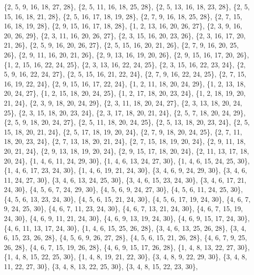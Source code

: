 \documentclass[11pt,a4paper]{article}
\begin{document}
{\{2, 5, 9, 16, 18, 27, 28\}, \{2, 5, 11, 16, 18, 25, 28\}, \{2, 5, 13, 16, 18, 23, 28\}, \{2, 5, 15, 16, 18, 21, 28\}, \{2, 5, 16, 17, 18, 19, 28\},
\{2, 7, 9, 16, 18, 25, 28\}, \{2, 7, 15, 16, 18, 19, 28\}, \{2, 9, 15, 16, 17, 18, 28\}, \{1, 2, 13, 16, 20, 26, 27\}, \{2, 3, 9, 16, 20, 26, 29\},
\{2, 3, 11, 16, 20, 26, 27\}, \{2, 3, 15, 16, 20, 23, 26\}, \{2, 3, 16, 17, 20, 21, 26\}, \{2, 5, 9, 16, 20, 26, 27\}, \{2, 5, 15, 16, 20, 21, 26\},
\{2, 7, 9, 16, 20, 25, 26\}, \{2, 9, 11, 16, 20, 21, 26\}, \{2, 9, 13, 16, 19, 20, 26\}, \{2, 9, 15, 16, 17, 20, 26\}, \{1, 2, 15, 16, 22, 24, 25\},
\{2, 3, 13, 16, 22, 24, 25\}, \{2, 3, 15, 16, 22, 23, 24\}, \{2, 5, 9, 16, 22, 24, 27\}, \{2, 5, 15, 16, 21, 22, 24\}, \{2, 7, 9, 16, 22, 24, 25\},
\{2, 7, 15, 16, 19, 22, 24\}, \{2, 9, 15, 16, 17, 22, 24\}, \{1, 2, 11, 18, 20, 24, 29\}, \{1, 2, 13, 18, 20, 24, 27\}, \{1, 2, 15, 18, 20, 24, 25\},
\{1, 2, 17, 18, 20, 23, 24\}, \{1, 2, 18, 19, 20, 21, 24\}, \{2, 3, 9, 18, 20, 24, 29\}, \{2, 3, 11, 18, 20, 24, 27\}, \{2, 3, 13, 18, 20, 24, 25\},
\{2, 3, 15, 18, 20, 23, 24\}, \{2, 3, 17, 18, 20, 21, 24\}, \{2, 5, 7, 18, 20, 24, 29\}, \{2, 5, 9, 18, 20, 24, 27\}, \{2, 5, 11, 18, 20, 24, 25\},
\{2, 5, 13, 18, 20, 23, 24\}, \{2, 5, 15, 18, 20, 21, 24\}, \{2, 5, 17, 18, 19, 20, 24\}, \{2, 7, 9, 18, 20, 24, 25\}, \{2, 7, 11, 18, 20, 23, 24\},
\{2, 7, 13, 18, 20, 21, 24\}, \{2, 7, 15, 18, 19, 20, 24\}, \{2, 9, 11, 18, 20, 21, 24\}, \{2, 9, 13, 18, 19, 20, 24\}, \{2, 9, 15, 17, 18, 20, 24\},
\{2, 11, 13, 17, 18, 20, 24\}, \{1, 4, 6, 11, 24, 29, 30\}, \{1, 4, 6, 13, 24, 27, 30\}, \{1, 4, 6, 15, 24, 25, 30\}, \{1, 4, 6, 17, 23, 24, 30\},
\{1, 4, 6, 19, 21, 24, 30\}, \{3, 4, 6, 9, 24, 29, 30\}, \{3, 4, 6, 11, 24, 27, 30\}, \{3, 4, 6, 13, 24, 25, 30\}, \{3, 4, 6, 15, 23, 24, 30\},
\{3, 4, 6, 17, 21, 24, 30\}, \{4, 5, 6, 7, 24, 29, 30\}, \{4, 5, 6, 9, 24, 27, 30\}, \{4, 5, 6, 11, 24, 25, 30\}, \{4, 5, 6, 13, 23, 24, 30\},
\{4, 5, 6, 15, 21, 24, 30\}, \{4, 5, 6, 17, 19, 24, 30\}, \{4, 6, 7, 9, 24, 25, 30\}, \{4, 6, 7, 11, 23, 24, 30\}, \{4, 6, 7, 13, 21, 24, 30\},
\{4, 6, 7, 15, 19, 24, 30\}, \{4, 6, 9, 11, 21, 24, 30\}, \{4, 6, 9, 13, 19, 24, 30\}, \{4, 6, 9, 15, 17, 24, 30\}, \{4, 6, 11, 13, 17, 24, 30\},
\{1, 4, 6, 15, 25, 26, 28\}, \{3, 4, 6, 13, 25, 26, 28\}, \{3, 4, 6, 15, 23, 26, 28\}, \{4, 5, 6, 9, 26, 27, 28\}, \{4, 5, 6, 15, 21, 26, 28\},
\{4, 6, 7, 9, 25, 26, 28\}, \{4, 6, 7, 15, 19, 26, 28\}, \{4, 6, 9, 15, 17, 26, 28\}, \{1, 4, 8, 13, 22, 27, 30\}, \{1, 4, 8, 15, 22, 25, 30\},
\{1, 4, 8, 19, 21, 22, 30\}, \{3, 4, 8, 9, 22, 29, 30\}, \{3, 4, 8, 11, 22, 27, 30\}, \{3, 4, 8, 13, 22, 25, 30\}, \{3, 4, 8, 15, 22, 23, 30\},
}
\end{document}
